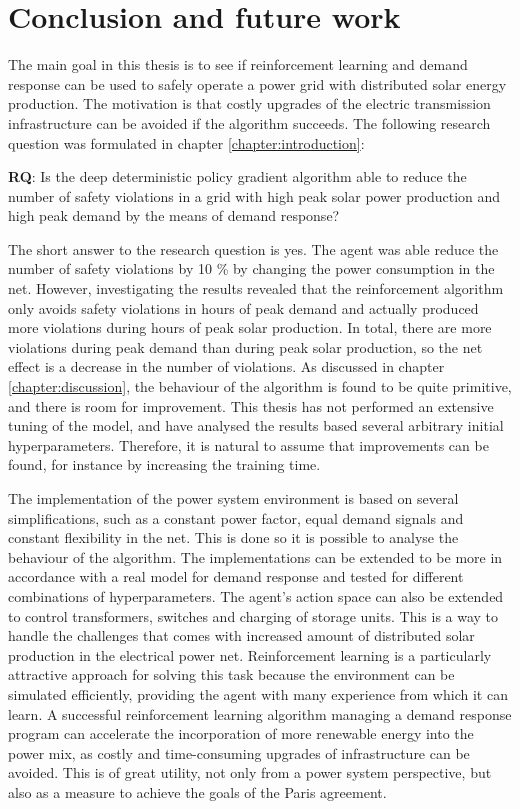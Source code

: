 \documentclass[class=book, crop=false, 11pt]{standalone}
\begin{document}
\chapter{Conclusion and future work}
The main goal in this thesis is to see if reinforcement learning and demand response can be used to safely operate a power grid with distributed solar energy production. The motivation is that costly upgrades of the electric transmission infrastructure can be avoided if the algorithm succeeds. The following research question was formulated in chapter \ref{chapter:introduction}: 

\begin{displayquote}
\textbf{RQ}: Is the deep deterministic policy gradient algorithm able to reduce the number of safety violations in a grid with high peak solar power production and high peak demand by the means of demand response? 
\end{displayquote}
The short answer to the research question is yes. The agent was able reduce the number of safety violations by 10 \% by changing the power consumption in the net. However, investigating the results revealed that the reinforcement algorithm only avoids safety violations in hours of peak demand and actually produced more violations during hours of peak solar production. In total, there are more violations during peak demand than during peak solar production, so the net effect is a decrease in the number of violations. As discussed in chapter \ref{chapter:discussion}, the behaviour of the algorithm is found to be quite primitive, and there is room for improvement. This thesis has not performed an extensive tuning of the model, and have analysed the results based several arbitrary initial hyperparameters. Therefore, it is natural to assume that improvements can be found, for instance by increasing the training time. 

The implementation of the power system environment is based on several simplifications, such as a constant power factor, equal demand signals and constant flexibility in the net. This is done so it is possible to analyse the behaviour of the algorithm. The implementations can be extended to be more in accordance with a real model for demand response and tested for different combinations of hyperparameters. The agent's action space can also be extended to control transformers, switches and charging of storage units. This is a way to handle the challenges that comes with increased amount of distributed solar production in the electrical power net. Reinforcement learning is a particularly attractive approach for solving this task because the environment can be simulated efficiently, providing the agent with many experience from which it can learn. A successful reinforcement learning algorithm managing a demand response program can accelerate the incorporation of more renewable energy into the power mix, as costly and time-consuming upgrades of infrastructure can be avoided. This is of great utility, not only from a power system perspective, but also as a measure to achieve the goals of the Paris agreement.
\end{document}
